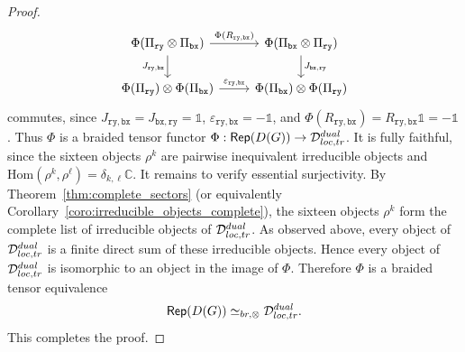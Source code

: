 \documentclass[10pt,a4paper]{amsart}
\theoremstyle{definition}
\theoremstyle{remark}
\theoremstyle{remark}
\newcommand\Rep {\mathsf{Rep}}
\newcommand\Hom {\mathrm{Hom}}
\begin{document}
\begin{proof}
\begin{equation*}
        \begin{tikzcd}
        	{\Phi(\Pi_{\mathtt{ry}}\otimes\Pi_{\mathtt{bx}})} & {\Phi(\Pi_{\mathtt{bx}}\otimes\Pi_{\mathtt{ry}})} \\
        	{\Phi(\Pi_{\mathtt{ry}})\otimes \Phi(\Pi_{\mathtt{bx}})} & {\Phi(\Pi_{\mathtt{bx}})\otimes\Phi(\Pi_{\mathtt{ry}})}
        	\arrow["{\Phi(R_{\mathtt{ry},\mathtt{bx}})}", from=1-1, to=1-2]
        	\arrow["{J_{\mathtt{ry},\mathtt{bx}}}"', from=1-1, to=2-1]
        	\arrow["{J_{\mathtt{bx},\mathtt{ry}}}", from=1-2, to=2-2]
        	\arrow["{\varepsilon_{\mathtt{ry},\mathtt{bx}}}", from=2-1, to=2-2]
        \end{tikzcd}
    \end{equation*}
    commutes, since $J_{\mathtt{ry},\mathtt{bx}} = J_{\mathtt{bx},\mathtt{ry}} = \mathds{1}$, $\varepsilon_{\mathtt{ry},\mathtt{bx}} = -\mathds{1}$, and $\Phi(R_{\mathtt{ry},\mathtt{bx}}) = R_{\mathtt{ry},\mathtt{bx}}\mathds{1} = -\mathds{1}$. 
    Thus $\Phi$ is a braided tensor functor $\Phi:\Rep(D(G)) \to \mathcal D_{\rm loc,tr}^{\rm dual}$. It is fully faithful, since the sixteen objects $\rho^k$ are pairwise inequivalent irreducible objects and $\Hom(\rho^k,\rho^\ell) = \delta_{k,\ell}\mathbb C$. It remains to verify essential surjectivity. By Theorem~\ref{thm:complete_sectors} (or equivalently Corollary~\ref{coro:irreducible_objects_complete}), the sixteen objects $\rho^k$ form the complete list of irreducible objects of $\mathcal D_{\rm loc,tr}^{\rm dual}$. As observed above, every object of $\mathcal D_{\rm loc,tr}^{\rm dual}$ is a finite direct sum of these irreducible objects. Hence every object of $\mathcal D_{\rm loc,tr}^{\rm dual}$ is isomorphic to an object in the image of $\Phi$. Therefore $\Phi$ is a braided tensor equivalence
    \[
        \Rep(D(G)) \simeq_{\rm br,\otimes} \mathcal D_{\rm loc,tr}^{\rm dual}.
    \]
    This completes the proof. 
\end{proof}
\end{document}
